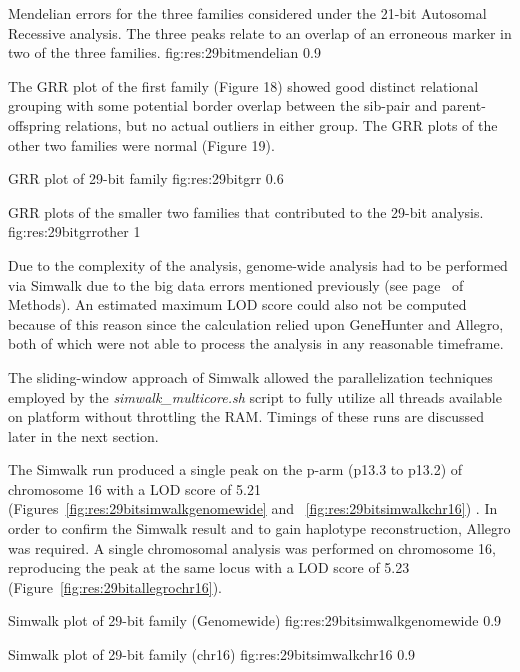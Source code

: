 	{Mendelian errors for the three families considered under the 21-bit Autosomal Recessive analysis. The three peaks relate to an overlap of an erroneous marker in two of the three families.}
	{fig:res:29bitmendelian}
	{0.9}

The GRR plot of the first family (Figure 18) showed good distinct relational grouping with some potential border overlap between the sib-pair and parent-offspring relations, but no actual outliers in either group. The GRR plots of the other two families were normal (Figure 19).

\vfill
{}
	{GRR plot of 29-bit family}
	{fig:res:29bitgrr}
	{0.6}

	{GRR plots of the smaller two families that contributed to the 29-bit analysis.}
	{fig:res:29bitgrrother}
	{1}

Due to the complexity of the analysis, genome-wide analysis had to be performed via Simwalk due to the big data errors mentioned previously (see page~\pageref{ref:meth:allegrobigdata} of Methods).  An estimated maximum LOD score could also not be computed because of this reason since the calculation relied upon GeneHunter and Allegro, both of which were not able to process the analysis in any reasonable timeframe.

The sliding-window approach of Simwalk allowed the parallelization techniques employed by the \textit{simwalk\_multicore.sh} script to fully utilize all threads available on platform without throttling the RAM. Timings of these runs are discussed later in the next section.

The Simwalk run produced a single peak on the p-arm (p13.3 to p13.2) of chromosome 16 with a LOD score of 5.21 (Figures~\ref{fig:res:29bitsimwalkgenomewide} and ~\ref{fig:res:29bitsimwalkchr16}) . In order to confirm the Simwalk result and to gain haplotype reconstruction, Allegro was required. A single chromosomal analysis was performed on chromosome 16, reproducing the peak at the same locus  with a LOD score of 5.23 (Figure~\ref{fig:res:29bitallegrochr16}).

	{Simwalk plot of 29-bit family (Genomewide)}
	{fig:res:29bitsimwalkgenomewide}
	{0.9}

	{Simwalk plot of 29-bit family (chr16)}
	{fig:res:29bitsimwalkchr16}
	{0.9}
	
